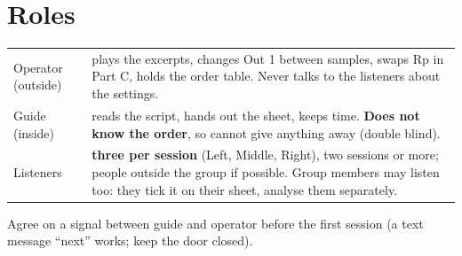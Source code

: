 \documentclass[11pt,a4paper]{article}
\begin{document}
\section{Roles}
\begin{tabularx}{\linewidth}{@{}lX@{}}\toprule
Operator (outside) & plays the excerpts, changes Out 1 between samples, swaps Rp in Part C, holds the order table. Never talks to the listeners about the settings.\\
Guide (inside) & reads the script, hands out the sheet, keeps time. \textbf{Does not know the order}, so cannot give anything away (double blind).\\
Listeners & \textbf{three per session} (Left, Middle, Right), two sessions or more; people outside the group if possible. Group members may listen too: they tick it on their sheet, analyse them separately.\\\bottomrule
\end{tabularx}
Agree on a signal between guide and operator before the first session (a text message ``next'' works; keep the door closed).
\end{document}
